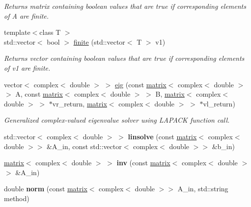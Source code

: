 \begin{DoxyCompactItemize}
\begin{DoxyCompactList}\small\item\em Returns matrix containing boolean values that are true if corresponding elements of A are finite. \end{DoxyCompactList}\item 
\hypertarget{namespacekeycpp_a6640e5ff779655aed8078c5de81af7ff}{{\footnotesize template$<$class T $>$ }\\std\-::vector$<$ bool $>$ \hyperlink{namespacekeycpp_a6640e5ff779655aed8078c5de81af7ff}{finite} (std\-::vector$<$ T $>$ v1)}\label{namespacekeycpp_a6640e5ff779655aed8078c5de81af7ff}

\begin{DoxyCompactList}\small\item\em Returns vector containing boolean values that are true if corresponding elements of v1 are finite. \end{DoxyCompactList}\item 
vector$<$ complex$<$ double $>$ $>$ \hyperlink{namespacekeycpp_a190640edb8e634de02d302d94a29ee17}{eig} (const \hyperlink{classkeycpp_1_1matrix}{matrix}$<$ complex$<$ double $>$ $>$ A, const \hyperlink{classkeycpp_1_1matrix}{matrix}$<$ complex$<$ double $>$ $>$ B, \hyperlink{classkeycpp_1_1matrix}{matrix}$<$ complex$<$ double $>$ $>$ $\ast$vr\-\_\-return, \hyperlink{classkeycpp_1_1matrix}{matrix}$<$ complex$<$ double $>$ $>$ $\ast$vl\-\_\-return)
\begin{DoxyCompactList}\small\item\em Generalized complex-\/valued eigenvalue solver using L\-A\-P\-A\-C\-K function call. \end{DoxyCompactList}\item 
\hypertarget{namespacekeycpp_acea0bb8f128ef0cdf55a79c50ceccb83}{std\-::vector$<$ complex$<$ double $>$ $>$ {\bfseries linsolve} (const \hyperlink{classkeycpp_1_1matrix}{matrix}$<$ complex$<$ double $>$$>$ \&A\-\_\-in, const std\-::vector$<$ complex$<$ double $>$$>$ \&b\-\_\-in)}\label{namespacekeycpp_acea0bb8f128ef0cdf55a79c50ceccb83}

\item 
\hypertarget{namespacekeycpp_ac9cabca49e9650ae8b5aadf5ee2f7f4e}{\hyperlink{classkeycpp_1_1matrix}{matrix}$<$ complex$<$ double $>$ $>$ {\bfseries inv} (const \hyperlink{classkeycpp_1_1matrix}{matrix}$<$ complex$<$ double $>$$>$ \&A\-\_\-in)}\label{namespacekeycpp_ac9cabca49e9650ae8b5aadf5ee2f7f4e}

\item 
\hypertarget{namespacekeycpp_af1a41d0919918b5cf62ef28dd68217d1}{double {\bfseries norm} (const \hyperlink{classkeycpp_1_1matrix}{matrix}$<$ complex$<$ double $>$$>$ A\-\_\-in, std\-::string method)}\label{namespacekeycpp_af1a41d0919918b5cf62ef28dd68217d1}


\end{DoxyCompactItemize}
